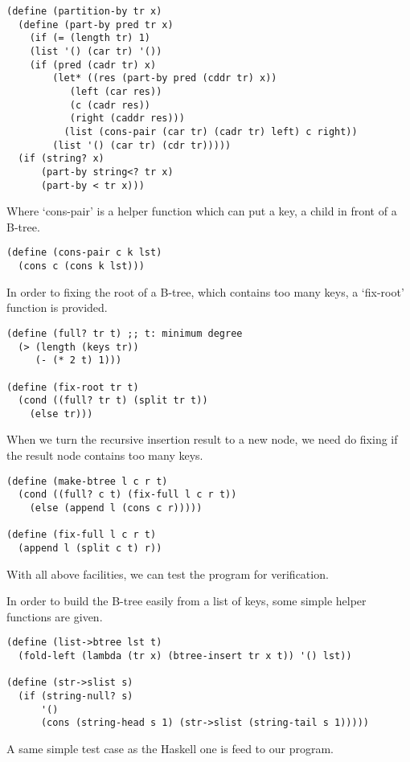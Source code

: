 \documentclass{article}
\begin{document}
\begin{lstlisting}
(define (partition-by tr x)
  (define (part-by pred tr x)
    (if (= (length tr) 1)
	(list '() (car tr) '())
	(if (pred (cadr tr) x)
	    (let* ((res (part-by pred (cddr tr) x))
		   (left (car res))
		   (c (cadr res))
		   (right (caddr res)))
	      (list (cons-pair (car tr) (cadr tr) left) c right))
	    (list '() (car tr) (cdr tr)))))
  (if (string? x)
      (part-by string<? tr x)
      (part-by < tr x)))
\end{lstlisting}

Where `cons-pair' is a helper function which can put a key, a
child in front of a B-tree.

\begin{lstlisting}
(define (cons-pair c k lst)
  (cons c (cons k lst)))
\end{lstlisting}

In order to fixing the root of a B-tree, which contains too many
keys, a `fix-root' function is provided.

\begin{lstlisting}
(define (full? tr t) ;; t: minimum degree
  (> (length (keys tr))
     (- (* 2 t) 1)))

(define (fix-root tr t)
  (cond ((full? tr t) (split tr t))
	(else tr)))
\end{lstlisting}

When we turn the recursive insertion result to a new node, we
need do fixing if the result node contains too many keys.

\begin{lstlisting}
(define (make-btree l c r t)
  (cond ((full? c t) (fix-full l c r t))
	(else (append l (cons c r)))))

(define (fix-full l c r t)
  (append l (split c t) r))
\end{lstlisting}

With all above facilities, we can test the program for verification.

In order to build the B-tree easily from a list of keys, some simple
helper functions are given.

\begin{lstlisting}
(define (list->btree lst t)
  (fold-left (lambda (tr x) (btree-insert tr x t)) '() lst))

(define (str->slist s)
  (if (string-null? s)
      '()
      (cons (string-head s 1) (str->slist (string-tail s 1)))))
\end{lstlisting}

A same simple test case as the Haskell one is feed to our program.
\end{document}
